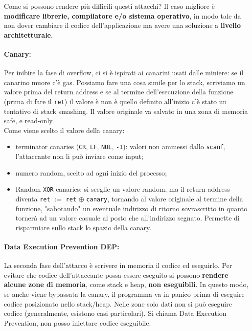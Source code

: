 Come si possono rendere più difficili questi attacchi? Il caso migliore è \textbf{modificare librerie, compilatore e/o sistema operativo}, in modo tale da non dover cambiare il codice dell'applicazione ma avere una soluzione a \textbf{livello architetturale}.\\

\paragraph{Canary:} Per inibire la fase di overflow, ci si è ispirati ai canarini usati dalle miniere: se il canarino muore c'è gas. Possiamo fare una cosa simile per lo stack, scriviamo un valore prima del return address e se al termine dell'esecuzione della funzione (prima di fare il \texttt{ret}) il valore è non è quello definito all'inizio c'è stato un tentativo di stack smashing. Il valore originale va salvato in una zona di memoria safe, e read-only.\\

Come viene scelto il valore della canary: 
\begin{itemize}
	\item terminator canaries (\texttt{CR}, \texttt{LF}, \texttt{NUL}, \texttt{-1}): valori non ammessi dallo \texttt{scanf}, l'attaccante non li può inviare come input;
	\item numero random, scelto ad ogni inizio del processo;
	\item Random \texttt{XOR} canaries: si sceglie un valore random, ma il return address diventa \texttt{ret} $:=$ \texttt{ret} $\oplus$ \texttt{canary}, tornando al valore originale al termine della funzione, "sabotando" un eventuale indirizzo di ritorno sovrascritto in quanto tornerà ad un valore casuale al posto che all'indirizzo segnato. Permette di risparmiare sullo stack lo spazio della canary.
\end{itemize}

\paragraph{Data Execution Prevention DEP:} La seconda fase dell'attacco è scrivere in memoria il codice ed eseguirlo. Per evitare che codice dell'attaccante possa essere eseguito si possono \textbf{rendere alcune zone di memoria}, come stack e heap, \textbf{non eseguibili}. In questo modo, se anche viene bypassata la canary, il programma va in panico prima di eseguire codice posizionato nello stack/heap. Nelle zone solo dati non si può eseguire codice (generalmente, esistono casi particolari). Si chiama Data Execution Prevention, non posso iniettare codice eseguibile.\\

